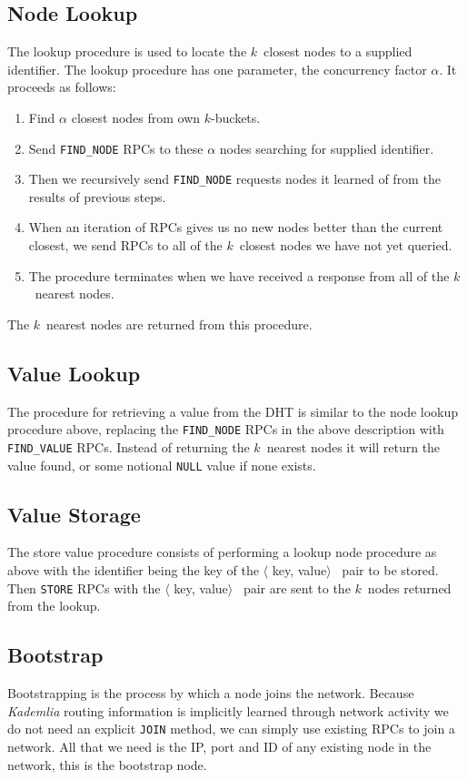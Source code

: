 \documentclass[12pt,notitlepage,a4paper]{report}
\newcommand{\kademlia}{\emph{Kademlia}}
\newcommand{\K}{$k$}
\begin{document}
	\subsection{Node Lookup}
	The lookup procedure is used to locate the \K~closest nodes to a supplied identifier. The lookup procedure has one parameter, the concurrency factor $\alpha$. It proceeds as follows:
	\begin{enumerate}
		\item Find $\alpha$ closest nodes from own \K-buckets.
		\item Send \texttt{FIND\_NODE} RPCs to these $\alpha$ nodes searching for supplied identifier.
		\item Then we recursively send \texttt{FIND\_NODE} requests nodes it learned of from the results of previous steps.
		\item When an iteration of RPCs gives us no new nodes better than the current closest, we send RPCs to all of the \K~closest nodes we have not yet queried.
		\item The procedure terminates when we have received a response from all of the \K~nearest nodes.
	\end{enumerate}
	The \K~nearest nodes are returned from this procedure.
	
	\subsection{Value Lookup}
	The procedure for retrieving a value from the DHT is similar to the node lookup procedure above, replacing the \texttt{FIND\_NODE} RPCs in the above description with \texttt{FIND\_VALUE} RPCs. Instead of returning the \K~nearest nodes it will return the value found, or some notional \texttt{NULL} value if none exists.
	
	\subsection{Value Storage}
	The store value procedure consists of performing a lookup node procedure as above with the identifier being the key of the $\langle$ key, value$\rangle$~ pair to be stored. Then \texttt{STORE} RPCs with the $\langle$ key, value$\rangle$~ pair are sent to the \K~nodes returned from the lookup.
	
	\subsection{Bootstrap}
	Bootstrapping is the process by which a node joins the network. Because \kademlia{} routing information is implicitly learned through network activity we do not need an explicit \texttt{JOIN} method, we can simply use existing RPCs to join a network. All that we need is the IP, port and ID of any existing node in the network, this is the bootstrap node.
	
\end{document}

